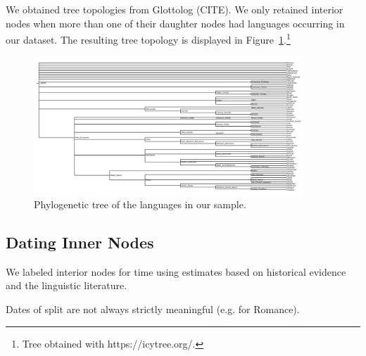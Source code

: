 \documentclass[11pt,a4paper]{article}
\begin{document}
We obtained tree topologies from Glottolog (CITE).
We only retained interior nodes when more than one of their daughter nodes had languages occurring in our dataset.
The resulting tree topology is displayed in Figure~\ref{fig:tree}.\footnote{Tree obtained with https://icytree.org/.}


\begin{figure}
    \centering
	\includegraphics[width=0.9\textwidth]{../trees/tree.png}
       \caption{Phylogenetic tree of the languages in our sample.}
    \label{fig:tree}
\end{figure}




\subsection{Dating Inner Nodes}
We labeled interior nodes for time using estimates based on historical evidence and the linguistic literature.


Dates of split are not always strictly meaningful (e.g. for Romance).
\end{document}
